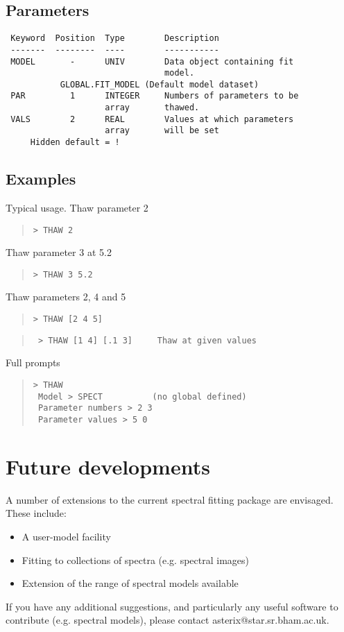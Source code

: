 \documentclass{book}
\renewcommand{\_}{{\tt\char'137}}     %
\begin{document}
\subsection{Parameters}
\begin{verbatim}
 Keyword  Position  Type        Description
 -------  --------  ----        -----------
 MODEL       -      UNIV        Data object containing fit
                                model.
           GLOBAL.FIT_MODEL (Default model dataset)
 PAR         1      INTEGER     Numbers of parameters to be
                    array       thawed.
 VALS        2      REAL        Values at which parameters
                    array       will be set
     Hidden default = !
\end{verbatim}\subsection{Examples}
Typical usage. Thaw parameter 2
\begin{quote}\begin{verbatim}
> THAW 2
\end{verbatim}\end{quote}
Thaw parameter 3 at 5.2
\begin{quote}\begin{verbatim}
> THAW 3 5.2
\end{verbatim}\end{quote}
Thaw parameters 2, 4 and 5
\begin{quote}\begin{verbatim}
> THAW [2 4 5]
\end{verbatim}\end{quote}
\begin{quote}\begin{verbatim}
 > THAW [1 4] [.1 3]     Thaw at given values
\end{verbatim}\end{quote}
Full prompts
\begin{quote}\begin{verbatim}
> THAW
 Model > SPECT          (no global defined)
 Parameter numbers > 2 3
 Parameter values > 5 0
\end{verbatim}\end{quote}
\section{Future developments}
A number of extensions to the current spectral fitting package
are envisaged. These include:
\begin{itemize}
\item A user-model facility
\item Fitting to collections of spectra (e.g. spectral images)
\item Extension of the range of spectral models available
\end{itemize}
If you have any additional suggestions, and particularly any useful
software to contribute (e.g. spectral models), please contact
asterix@star.sr.bham.ac.uk.
 
\end{document}
